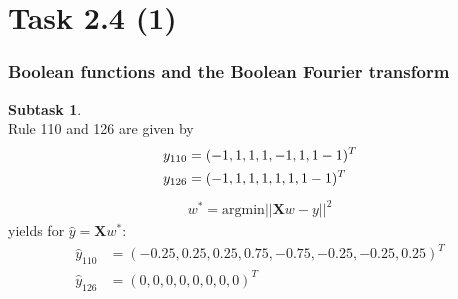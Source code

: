 \documentclass{beamer}
\begin{document}
\section{Task 2.4 (1)}


\begin{frame}
	\frametitle{Boolean functions and the Boolean Fourier transform}
	\textbf{Subtask 1}.\\
	Rule 110 and 126 are given by
	\begin{align*}
	y_{110} &= (-1,1,1,1,-1,1,1-1)^T \\\bigskip
	y_{126} &=  (-1,1,1,1,1,1,1-1)^T
	\end{align*}
	\begin{align*}
	w^* = \text{argmin}||\mathbf{X} w - y||^2	
	\end{align*}
	yields for $\hat{y} = \mathbf{X}w^*$:
	\begin{align*}
	\hat{y}_{110}&= (-0.25,  0.25,  0.25,  0.75, -0.75, -0.25, -0.25,  0.25)^T\\
	\hat{y}_{126}&= (0,0,0,0,0,0,0,0)^T
	\end{align*}
\end{frame}
\end{document}
